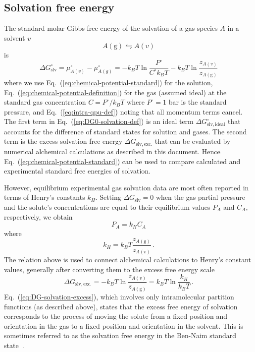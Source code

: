 \documentclass[9pt,bestpractices]{livecoms}
\begin{document}
\subsection{Solvation free energy}\label{sec:theory-solvation}

The standard molar Gibbs free energy of the solvation of a gas species $A$ in a solvent $v$
\begin{equation}
A(\mathrm{g})  \leftrightharpoons A(v)
\end{equation}
is
\begin{equation}
  \Delta G^\circ_{\mathrm{slv}} = \mu^\circ_{A(v)}  - \mu^\circ_{A(g)} = -k_B T \ln \frac{P^\circ}{C^\circ k_B T} - k_B T \ln \frac{z_{A(v)}}{z_{A(\mathrm{g})}}
  \label{eq:DG0-solvation-def}
\end{equation}
where we use Eq.~(\ref{eq:chemical-potential-standard}) for the solution, Eq.~(\ref{eq:chemical-potential-definition}) for the gas (assumed ideal) at the standard gas concentration $C = P^\circ/k_B T$ where $P^\circ = 1$ bar is the standard pressure, and Eq.~(\ref{eq:intra-qpu-def}) noting that all momentum terms cancel. The first term in Eq.~(\ref{eq:DG0-solvation-def}) is an ideal term $\Delta G^\circ_{\mathrm{slv,ideal}}$ that accounts for the difference of standard states for solution and gases. The second term is the excess solvation free energy $\Delta G_{\mathrm{slv, exc.}}$ that can be evaluated by numerical alchemical calculations as described in this document. Hence Eq.~(\ref{eq:chemical-potential-standard}) can be used to compare calculated and experimental standard free energies of solvation\cite{thompson2004new}.

However, equilibrium experimental gas solvation data are most often reported in terms of Henry's constants $k_H$. Setting $\Delta G_{\mathrm{slv}} = 0$ when the gas partial pressure and the solute's concentrations are equal to their equilibrium values $P_A$ and $C_A$, respectively, we obtain
\begin{equation}
  P_A = k_H C_A
  \label{eq:Henrys-law}
\end{equation}
where
\begin{equation}
  k_H = k_B T \frac{z_{A(\mathrm{g})}}{z_{A(v)}} \, .
  \label{eq:Henrys-constant}
\end{equation}
The relation above is used to connect alchemical calculations to Henry's constant values, generally after converting them to the excess free energy scale~\cite{cabani1981group,nicholls2008predicting,mobley2014freesolv}
\begin{equation}
\Delta G_{\mathrm{slv, exc.}} = - k_B T \ln \frac{z_{A(v)}}{z_{A(\mathrm{g})}} = k_B T \ln \frac{k_H}{k_B T} \, .
\label{eq:DG-solvation-excess}
\end{equation}
Eq.~(\ref{eq:DG-solvation-excess}), which involves only intramolecular partition functions (as described above),  states that the excess free energy of solvation corresponds to the process of moving the solute from a fixed position and orientation in the gas to a fixed position and orientation in the solvent. This is sometimes referred to as the solvation free energy in the Ben-Naim standard state~\cite{bennaim1984solvation}.
\end{document}
